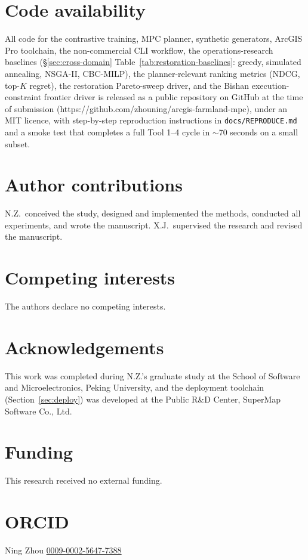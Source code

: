 \documentclass[11pt]{article}
\begin{document}
\section*{Code availability}
All code for the contrastive training, MPC planner, synthetic generators, ArcGIS Pro toolchain, the non-commercial CLI workflow, the operations-research baselines (\S\ref{sec:cross-domain} Table~\ref{tab:restoration-baselines}: greedy, simulated annealing, NSGA-II, CBC-MILP), the planner-relevant ranking metrics (NDCG, top-$K$ regret), the restoration Pareto-sweep driver, and the Bishan execution-constraint frontier driver is released as a public repository on GitHub at the time of submission (https://github.com/zhouning/arcgis-farmland-mpc), under an MIT licence, with step-by-step reproduction instructions in \texttt{docs/REPRODUCE.md} and a smoke test that completes a full Tool 1--4 cycle in $\sim$70 seconds on a small subset.

\section*{Author contributions}
N.Z.\ conceived the study, designed and implemented the methods, conducted all experiments, and wrote the manuscript. X.J.\ supervised the research and revised the manuscript.

\section*{Competing interests}
The authors declare no competing interests.

\section*{Acknowledgements}
This work was completed during N.Z.'s graduate study at the School of Software and Microelectronics, Peking University, and the deployment toolchain (Section~\ref{sec:deploy}) was developed at the Public R\&D Center, SuperMap Software Co., Ltd.

\section*{Funding}
This research received no external funding.

\section*{ORCID}
Ning Zhou \href{https://orcid.org/0009-0002-5647-7388}{0009-0002-5647-7388}


\end{document}
